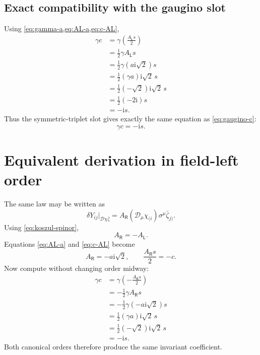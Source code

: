\documentclass[11pt,a4paper,UTF8]{ctexart}
\numberwithin{equation}{section}
\newcommand{\ii}{\mathrm i}
\newcommand{\cD}{\mathcal D}
\newcommand{\PL}{\mathsf L}
\newcommand{\PR}{\mathsf R}
\newcommand{\slot}{\big\vert}
\begin{document}
\subsection{Exact compatibility with the gaugino slot}

Using \cref{eq:gamma-a,eq:AL-a,eq:c-AL},
\begin{align}
\gamma c
&=\gamma\left(\frac{A_{\PL}s}{2}\right)
\\
&=\frac12\gamma A_{\PL}s
\\
&=\frac12\gamma(a\ii\sqrt2)s
\\
&=\frac12(\gamma a)\ii\sqrt2\,s
\\
&=\frac12(-\sqrt2)\ii\sqrt2\,s
\\
&=\frac12(-2\ii)s
\\
&=-\ii s.
\end{align}
Thus the symmetric-triplet slot gives exactly the same equation as \cref{eq:gaugino-c}:
\begin{equation}
\boxed{\gamma c=-\ii s.}
\end{equation}

\section{Equivalent derivation in field-left order}

The same law may be written as
\begin{equation}
\boxed{
\delta Y_{ij}\slot_{\cD\chi\bar\zeta}
=A_{\PR}(\cD_\mu\chi_{(i})\sigma^\mu\bar\zeta_{j)}.}
\label{eq:Y-right-law}
\end{equation}
Using \cref{eq:koszul-spinor},
\begin{equation}
A_{\PR}=-A_{\PL}.
\label{eq:ARminusAL}
\end{equation}
Equations \eqref{eq:AL-a} and \eqref{eq:c-AL} become
\begin{equation}
\boxed{
A_{\PR}=-a\ii\sqrt2,
\qquad
\frac{A_{\PR}s}{2}=-c.}
\label{eq:right-relations}
\end{equation}
Now compute without changing order midway:
\begin{align}
\gamma c
&=\gamma\left(-\frac{A_{\PR}s}{2}\right)
\\
&=-\frac12\gamma A_{\PR}s
\\
&=-\frac12\gamma(-a\ii\sqrt2)s
\\
&=\frac12(\gamma a)\ii\sqrt2\,s
\\
&=\frac12(-\sqrt2)\ii\sqrt2\,s
\\
&=-\ii s.
\end{align}
Both canonical orders therefore produce the same invariant coefficient.
\end{document}
